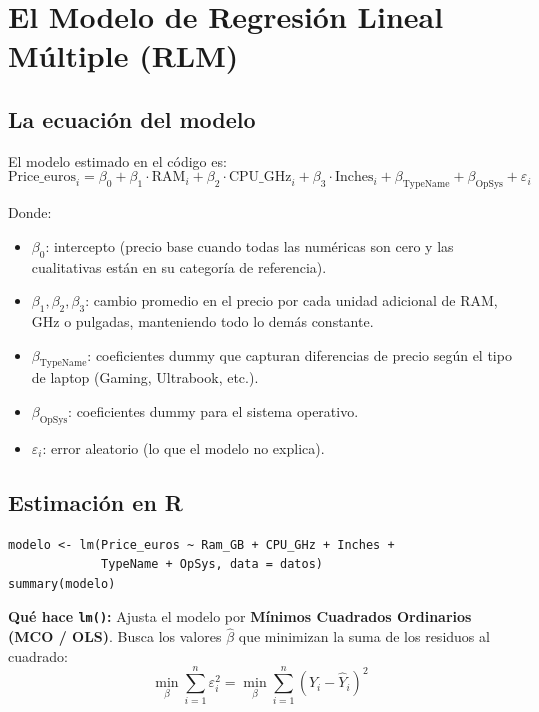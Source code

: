 \documentclass[12pt,a4paper]{article}
\begin{document}
\section{El Modelo de Regresión Lineal Múltiple (RLM)}

\subsection{La ecuación del modelo}

El modelo estimado en el código es:
\[
\text{Price\_euros}_i = \beta_0 + \beta_1 \cdot \text{RAM}_i + \beta_2 \cdot \text{CPU\_GHz}_i + \beta_3 \cdot \text{Inches}_i + \beta_{\text{TypeName}} + \beta_{\text{OpSys}} + \varepsilon_i
\]

Donde:
\begin{itemize}
    \item $\beta_0$: intercepto (precio base cuando todas las numéricas son cero y las cualitativas están en su categoría de referencia).
    \item $\beta_1, \beta_2, \beta_3$: cambio promedio en el precio por cada unidad adicional de RAM, GHz o pulgadas, manteniendo todo lo demás constante.
    \item $\beta_{\text{TypeName}}$: coeficientes dummy que capturan diferencias de precio según el tipo de laptop (Gaming, Ultrabook, etc.).
    \item $\beta_{\text{OpSys}}$: coeficientes dummy para el sistema operativo.
    \item $\varepsilon_i$: error aleatorio (lo que el modelo no explica).
\end{itemize}

\subsection{Estimación en R}

\begin{lstlisting}[caption={Ajuste del modelo RLM}]
modelo <- lm(Price_euros ~ Ram_GB + CPU_GHz + Inches + 
             TypeName + OpSys, data = datos)
summary(modelo)
\end{lstlisting}

\textbf{Qué hace \texttt{lm()}:} Ajusta el modelo por \textbf{Mínimos Cuadrados Ordinarios (MCO / OLS)}. Busca los valores $\hat{\beta}$ que minimizan la suma de los residuos al cuadrado:
\[
\min_{\beta} \sum_{i=1}^{n} \varepsilon_i^2 = \min_{\beta} \sum_{i=1}^{n} (Y_i - \hat{Y}_i)^2
\]
\end{document}
